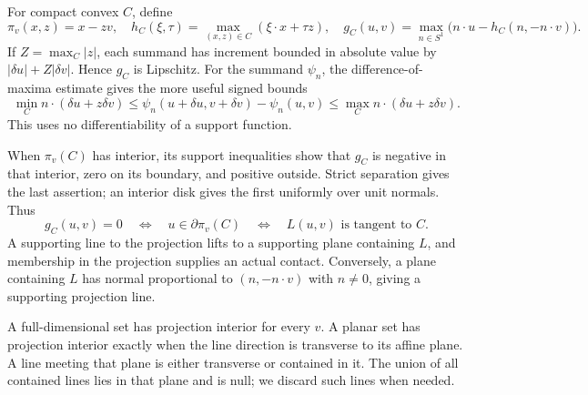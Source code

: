 \documentclass[11pt]{article}
\theoremstyle{remark}
\begin{document}
For compact convex $C$, define
\[
\pi_v(x,z)=x-zv,\quad
h_C(\xi,\tau)=\max_{(x,z)\in C}(\xi\cdot x+\tau z),\quad
g_C(u,v)=\max_{n\in S^1}\bigl(n\cdot u-h_C(n,-n\cdot v)\bigr).
\]
If $Z=\max_C|z|$, each summand has increment bounded in absolute value by $|\delta u|+Z|\delta v|$. Hence $g_C$ is Lipschitz. For the summand $\psi_n$, the difference-of-maxima estimate gives the more useful signed bounds
\begin{equation}\label{eq:increment}
\min_C n\cdot(\delta u+z\delta v)
\le\psi_n(u+\delta u,v+\delta v)-\psi_n(u,v)
\le\max_C n\cdot(\delta u+z\delta v).
\end{equation}
This uses no differentiability of a support function.

When $\pi_v(C)$ has interior, its support inequalities show that $g_C$ is negative in that interior, zero on its boundary, and positive outside. Strict separation gives the last assertion; an interior disk gives the first uniformly over unit normals. Thus
\begin{equation}\label{eq:zero}
g_C(u,v)=0\quad\Longleftrightarrow\quad
u\in\partial\pi_v(C)\quad\Longleftrightarrow\quad L(u,v)\text{ is tangent to }C.
\end{equation}
A supporting line to the projection lifts to a supporting plane containing $L$, and membership in the projection supplies an actual contact. Conversely, a plane containing $L$ has normal proportional to $(n,-n\cdot v)$ with $n\ne0$, giving a supporting projection line.

A full-dimensional set has projection interior for every $v$. A planar set has projection interior exactly when the line direction is transverse to its affine plane. A line meeting that plane is either transverse or contained in it. The union of all contained lines lies in that plane and is null; we discard such lines when needed.
\end{document}
